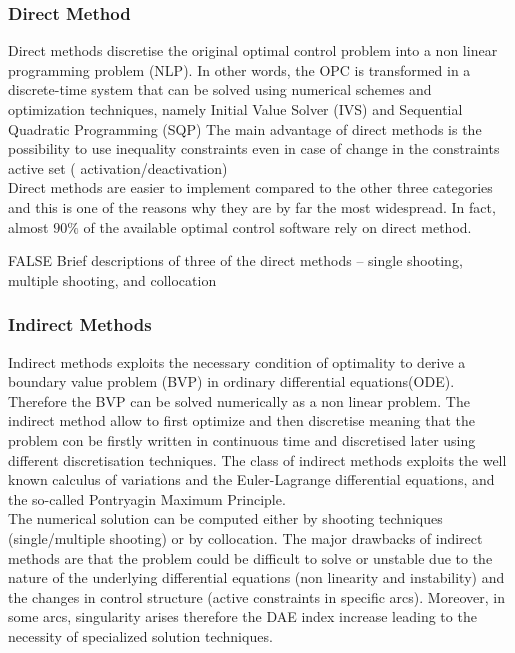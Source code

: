 \subsubsection{Direct Method}

Direct methods discretise the original optimal control problem into a  non linear programming problem (NLP). In other words, the OPC is transformed in a discrete-time system that can be solved using numerical schemes and  optimization techniques, namely Initial Value Solver (IVS) and Sequential Quadratic Programming (SQP) \cite{bertolazzi2005symbolic}
The main advantage of direct methods is the possibility to use inequality constraints even in case of change in the constraints active set ( activation/deactivation)\cite{biral2016notes}\\
Direct methods are easier to implement compared to the other three categories and this is one of the reasons why they are by far the most widespread. In fact, almost $90\%$ of the available optimal control software rely on direct method. \cite{rao2009survey,rodrigues2014optimal}

\if FALSE
Brief descriptions
of three of the direct methods – single shooting, multiple shooting, and collocation
\fi

% 



\subsubsection{Indirect Methods}

Indirect methods exploits the necessary condition of optimality to derive a boundary value problem (BVP) in ordinary differential equations(ODE). Therefore the BVP can be solved numerically as a non linear problem. The indirect method allow to first optimize and then discretise meaning that the problem con be firstly written in continuous time and discretised later using different discretisation techniques.
The class of indirect methods exploits the well known calculus of variations
and the Euler-Lagrange differential equations, and the so-called Pontryagin
Maximum Principle.\cite{bertolazzi2006symbolic} \\
The numerical solution can be computed either by shooting techniques (single/multiple shooting) or by collocation.
The major drawbacks of indirect methods are that the problem could be difficult to solve or unstable due to the nature of the underlying differential equations (non linearity and instability) and the changes in control structure (active constraints in specific arcs). Moreover, in some arcs, singularity arises therefore the DAE index increase leading to the necessity of specialized solution techniques. \cite{biral2016notes}



